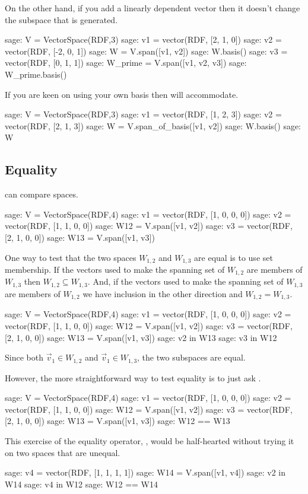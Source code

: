 On the other hand, if you add a linearly dependent vector then
it doesn't change the subspace that is generated.
\begin{sagecommandline}
sage: V = VectorSpace(RDF,3)               
sage: v1 = vector(RDF, [2, 1, 0]) 
sage: v2 = vector(RDF, [-2, 0, 1]) 
sage: W = V.span([v1, v2])       
sage: W.basis()
sage: v3 = vector(RDF, [0, 1, 1])
sage: W_prime = V.span([v1, v2, v3])
sage: W_prime.basis()
\end{sagecommandline}

If you are keen on using your own basis then \Sage{} will
accommodate.
\begin{sagecommandline}
sage: V = VectorSpace(RDF,3)
sage: v1 = vector(RDF, [1, 2, 3])
sage: v2 = vector(RDF, [2, 1, 3])
sage: W = V.span_of_basis([v1, v2])
sage: W.basis()
sage: W
\end{sagecommandline}




\subsection{Equality}

\Sage{} can compare spaces.
\begin{sagecommandline}
sage: V = VectorSpace(RDF,4)
sage: v1 = vector(RDF, [1, 0, 0, 0])
sage: v2 = vector(RDF, [1, 1, 0, 0])
sage: W12 = V.span([v1, v2])
sage: v3 = vector(RDF, [2, 1, 0, 0])
sage: W13 = V.span([v1, v3])  
\end{sagecommandline}
One way to test that the two spaces $W_{1,2}$ and $W_{1,3}$ 
are equal is to use set membership.
If the vectors used to make the spanning set of  $W_{1,2}$ are 
members of  $W_{1,3}$ then  $W_{1,2}\subseteq W_{1,3}$.
And, if the vectors used to make the spanning set of  $W_{1,3}$ are 
members of  $W_{1,2}$ we have inclusion in the other direction and 
$W_{1,2}=W_{1,3}$.
\begin{sagecommandline}
sage: V = VectorSpace(RDF,4)
sage: v1 = vector(RDF, [1, 0, 0, 0])
sage: v2 = vector(RDF, [1, 1, 0, 0])
sage: W12 = V.span([v1, v2])
sage: v3 = vector(RDF, [2, 1, 0, 0])
sage: W13 = V.span([v1, v3])  
sage: v2 in W13
sage: v3 in W12
\end{sagecommandline}
Since both $\vec{v}_1\in W_{1,2}$ and $\vec{v}_1\in W_{1,3}$, the
two subspaces are equal.

However, the more straightforward way to test equality is to just ask \Sage{}.
\begin{sagecommandline}
sage: V = VectorSpace(RDF,4)
sage: v1 = vector(RDF, [1, 0, 0, 0])
sage: v2 = vector(RDF, [1, 1, 0, 0])
sage: W12 = V.span([v1, v2])
sage: v3 = vector(RDF, [2, 1, 0, 0])
sage: W13 = V.span([v1, v3])  
sage: W12 == W13
\end{sagecommandline}
\noindent
This exercise of the equality operator, \inlinecode{==}, 
would be half-hearted without trying it on two spaces that are
unequal. 
\begin{sagecommandline}
sage: v4 = vector(RDF, [1, 1, 1, 1])
sage: W14 = V.span([v1, v4])
sage: v2 in W14
sage: v4 in W12
sage: W12 == W14
\end{sagecommandline}

